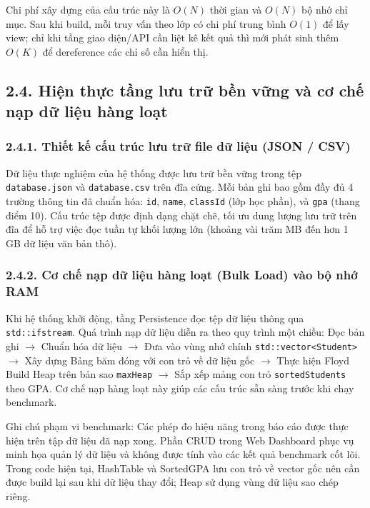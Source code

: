 \documentclass[14pt,a4paper]{extarticle}
\begin{document}
Chi phí xây dựng của cấu trúc này là $O(N)$ thời gian và $O(N)$ bộ nhớ chỉ mục. Sau khi build, mỗi truy vấn theo lớp có chi phí trung bình $O(1)$ để lấy view; chỉ khi tầng giao diện/API cần liệt kê kết quả thì mới phát sinh thêm $O(K)$ để dereference các chỉ số cần hiển thị.
\subsection*{2.4. Hiện thực tầng lưu trữ bền vững và cơ chế nạp dữ liệu hàng loạt}
{}

\subsubsection*{2.4.1. Thiết kế cấu trúc lưu trữ file dữ liệu (JSON / CSV)}
{}

Dữ liệu thực nghiệm của hệ thống được lưu trữ bền vững trong tệp \texttt{database.json} và \texttt{database.csv} trên đĩa cứng. Mỗi bản ghi bao gồm đầy đủ 4 trường thông tin đã chuẩn hóa: \texttt{id}, \texttt{name}, \texttt{classId} (lớp học phần), và \texttt{gpa} (thang điểm 10). Cấu trúc tệp được định dạng chặt chẽ, tối ưu dung lượng lưu trữ trên đĩa để hỗ trợ việc đọc tuần tự khối lượng lớn (khoảng vài trăm MB đến hơn 1 GB dữ liệu văn bản thô).

\subsubsection*{2.4.2. Cơ chế nạp dữ liệu hàng loạt (Bulk Load) vào bộ nhớ RAM}
{}

Khi hệ thống khởi động, tầng Persistence đọc tệp dữ liệu thông qua \texttt{std::ifstream}. Quá trình nạp dữ liệu diễn ra theo quy trình một chiều: Đọc bản ghi $\rightarrow$ Chuẩn hóa dữ liệu $\rightarrow$ Đưa vào vùng nhớ chính \texttt{std::vector<Student>} $\rightarrow$ Xây dựng Bảng băm đóng với con trỏ về dữ liệu gốc $\rightarrow$ Thực hiện Floyd Build Heap trên bản sao \texttt{maxHeap} $\rightarrow$ Sắp xếp mảng con trỏ \texttt{sortedStudents} theo GPA. Cơ chế nạp hàng loạt này giúp các cấu trúc sẵn sàng trước khi chạy benchmark.

Ghi chú phạm vi benchmark: Các phép đo hiệu năng trong báo cáo được thực hiện trên tập dữ liệu đã nạp xong. Phần CRUD trong Web Dashboard phục vụ minh họa quản lý dữ liệu và không được tính vào các kết quả benchmark cốt lõi. Trong code hiện tại, HashTable và SortedGPA lưu con trỏ về vector gốc nên cần được build lại sau khi dữ liệu thay đổi; Heap sử dụng vùng dữ liệu sao chép riêng.
\end{document}
